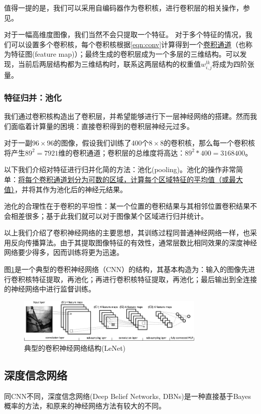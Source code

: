 值得一提的是，我们可以采用自编码器作为卷积核，进行卷积层的相关操作，参见\cite{deep_learning_ufldl}。

对于一幅高维度图像，我们当然不会只提取一个特征。 对于多个特征的情况，我们可以设置多个卷积核，每个卷积核根据\ref{eqn:conv}计算得到一个\uline{卷积通道}（也称为特征图(feature map)）；最终生成的卷积层成为一个多层的三维结构。可以发现，当前后两层结构都为三维结构时，联系这两层结构的权重值$w^{lk}_{i,j}$将成为四阶张量。

\subsubsection{特征归并：池化}
我们通过卷积核构造出了卷积层，并希望能够进行下一层神经网络的搭建。然而我们面临着计算量的困境：直接卷积得到的卷积层神经元过多。

对于一副$96\times96$的图像，假设我们训练了400个$8\times8$的卷积核，那么每一个卷积核将产生$89^2=7921$维的卷积通道；卷积层的总维度将高达：$89^2*400 = 3168400$。

以下我们介绍对特征进行归并化简的方法：池化(pooling)。池化的操作非常简单：\uline{将每个卷积通道划分为可数的区域，计算每个区域特征的平均值（或最大值）}，并将其作为池化后的神经元结果。

池化的合理性在于卷积的平坦性：某一个位置的卷积结果与其相邻位置卷积结果不会相差很多；基于此我们就可以对于图像某个区域进行归并统计。

以上我们介绍了卷积神经网络的主要思想，其训练过程同普通神经网络一样，也采用反向传播算法。由于其提取图像特征的有效性，通常层数比相同效果的深度神经网络要少得多，因而训练将更为迅速。

图\ref{fig:lenet}是一个典型的卷积神经网络（CNN）的结构，其基本构造为：输入的图像先进行卷积核特征提取，再池化；再进行卷积核特征提取，再池化；最后输出到全连接的神经网络中进行监督训练。

\begin{figure}[htbp]
   \centering
   \includegraphics[width=0.8\textwidth]{Lenet.png} %
   \caption{典型的卷积神经网络结构(LeNet)}
   \label{fig:lenet}
\end{figure}

\subsection{深度信念网络}
同CNN不同，深度信念网络(Deep Belief Networks, DBNs)是一种直接基于Bayes概率的方法，和原来的神经网络方法有较大的不同。


